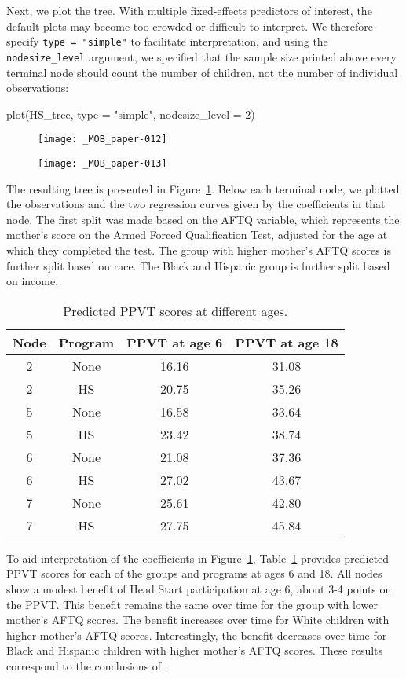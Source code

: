 \documentclass[doc,floatsintext,natbib]{apa7}
\begin{document}
Next, we plot the tree. With multiple fixed-effects predictors of interest, the default plots may become too crowded or difficult to interpret. We therefore specify \verb|type = "simple"| to facilitate interpretation, and using the \verb|nodesize_level| argument, we specified that the sample size printed above every terminal node should count the number of children, not the number of individual observations:

\begin{Schunk}
\begin{Sinput}
 plot(HS_tree, type = "simple", nodesize_level = 2)
\end{Sinput}
\end{Schunk}

\begin{figure}%
\caption{}
\texttt{[image: \_MOB\_paper-012]}

\vspace*{-3cm}

\texttt{[image: \_MOB\_paper-013]}
\label{fig:lmm_tree}
\end{figure}%

The resulting tree is presented in Figure~\ref{fig:lmm_tree}. Below each terminal node, we plotted the observations and the two regression curves given by the coefficients in that node. The first split was made based on the AFTQ variable, which represents the mother's score on the Armed Forced Qualification Test, adjusted for the age at which they completed the test. The group with higher mother's AFTQ scores is further split based on race. The Black and Hispanic group is further split based on income. 

\begin{table}

\caption{\label{tab:predictions}Predicted PPVT scores at different ages.}
\begin{tabular}[t]{cccc}
\toprule
Node & Program & PPVT at age 6 & PPVT at age 18\\
\midrule
2 & None & 16.16 & 31.08\\
2 & HS & 20.75 & 35.26\\
5 & None & 16.58 & 33.64\\
5 & HS & 23.42 & 38.74\\
6 & None & 21.08 & 37.36\\
6 & HS & 27.02 & 43.67\\
7 & None & 25.61 & 42.80\\
7 & HS & 27.75 & 45.84\\
\bottomrule
\end{tabular}
\end{table}
To aid interpretation of the coefficients in Figure~\ref{fig:lmm_tree}, Table~\ref{tab:predictions} provides predicted PPVT scores for each of the groups and programs at ages 6 and 18. All nodes show a modest benefit of Head Start participation at age 6, about 3-4 points on the PPVT. This benefit remains the same over time for the group with lower mother's AFTQ scores. The benefit increases over time for White children with higher mother's AFTQ scores. Interestingly, the benefit decreases over time for Black and Hispanic children with higher mother's AFTQ scores. These results correspond to the conclusions of \cite{Demi09}. 
\end{document}
